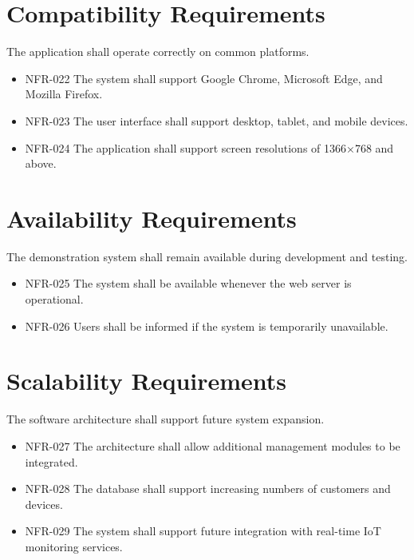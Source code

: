 \section{Compatibility Requirements}

The application shall operate correctly on common platforms.

\begin{itemize}
    \item NFR-022 The system shall support Google Chrome, Microsoft Edge, and Mozilla Firefox.
    \item NFR-023 The user interface shall support desktop, tablet, and mobile devices.
    \item NFR-024 The application shall support screen resolutions of 1366×768 and above.
\end{itemize}

\section{Availability Requirements}

The demonstration system shall remain available during development and testing.

\begin{itemize}
    \item NFR-025 The system shall be available whenever the web server is operational.
    \item NFR-026 Users shall be informed if the system is temporarily unavailable.
\end{itemize}

\section{Scalability Requirements}

The software architecture shall support future system expansion.

\begin{itemize}
    \item NFR-027 The architecture shall allow additional management modules to be integrated.
    \item NFR-028 The database shall support increasing numbers of customers and devices.
    \item NFR-029 The system shall support future integration with real-time IoT monitoring services.
\end{itemize}